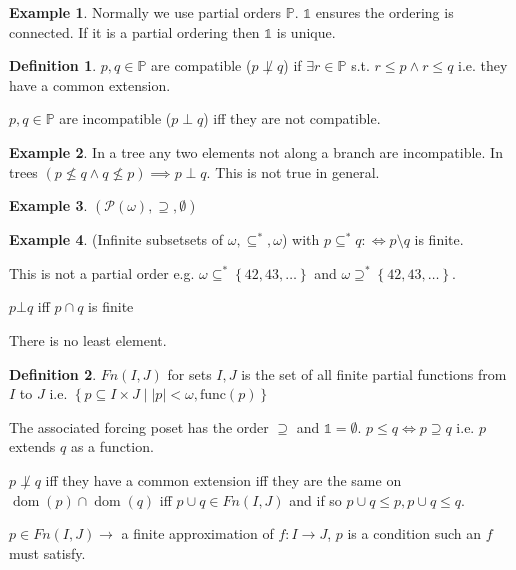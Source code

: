 \documentclass{scrartcl}
\renewcommand{\P}{\mathcal{P}}
\newcommand{\set}[1]{\left\{#1\right\}}
\DeclareMathOperator{\dom}{dom}
\theoremstyle{definition}
\newtheorem*{definition*}{Definition}
\newtheorem*{example*}{Example}
\theoremstyle{plain}
\theoremstyle{remark}
\begin{document}
	\begin{example*}
		Normally we use partial orders $\mathbb{P}$. $\mathbb{1}$ ensures the ordering is connected. If it is a partial ordering then $\mathbb{1}$ is unique.
	\end{example*}

	\begin{definition*}
		$p, q \in \mathbb{P}$ are compatible ($p \not\perp q$) if $\exists r \in \mathbb{P}$ s.t. $r \leq p \land r \leq q$ i.e. they have a common extension.
		
		$p, q \in \mathbb{P}$ are incompatible ($p \perp q$) iff they are not compatible. 
	\end{definition*}

	\begin{example*}
		In a tree any two elements not along a branch are incompatible. In trees $(p \nleq q \land q \nleq p) \implies p \perp q$. This is not true in general.
	\end{example*}

	\begin{example*}
		$(\P(\omega), \supseteq, \emptyset)$
	\end{example*}

	\begin{example*}
		(Infinite subsetsets of $\omega, \subseteq^*, \omega$) with $p \subseteq^* q :\iff p \setminus q $ is finite.
		
		This is not a partial order e.g. $\omega \subseteq^* \set{42, 43, \dots}$ and $\omega \supseteq^* \set{42, 43, \dots}$.
		
		$p \bot q$ iff $p\cap q$ is finite
		
		There is no least element.	
	\end{example*}

	\begin{definition*}
		$Fn(I, J)$ for sets $I, J$ is the set of all finite partial functions from $I$ to $J$ i.e. $\set{p \subseteq I \times J \mid |p| < \omega, \text{func}(p)}$
		
		The associated forcing poset has the order $\supseteq$ and $\mathbb{1} = \emptyset$. $p \leq q \iff p \supseteq q$ i.e. $p$ extends $q$ as a function.
		
		$p \not\perp q$ iff they have a common extension iff they are the same on $\dom(p) \cap \dom(q)$ iff $p \cup q \in Fn(I, J)$ and if so $p\cup q \leq p, p \cup q \leq q$.
		
		$p \in Fn(I, J) \longrightarrow$ a finite approximation of $f: I \to J$, $p$ is a condition such an $f$ must satisfy.  
	\end{definition*}
\end{document}
